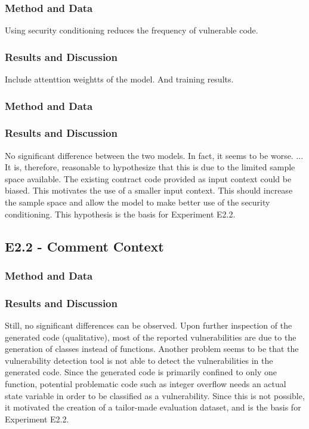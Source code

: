 \subsubsection{Method and Data}
Using security conditioning reduces the frequency of vulnerable code.

\subsubsection{Results and Discussion}
Include attenttion weightts of the model. And training results.

\label{sec:e2.1-complete-class-context}

\subsubsection{Method and Data}
\subsubsection{Results and Discussion}

No significant difference between the two models. In fact, it seems to be worse. ... It is, therefore, reasonable to hypothesize that this is due to the limited sample space available. The existing contract code provided as input context could be biased. This motivates the use of a smaller input context. This should increase the sample space and allow the model to make better use of the security conditioning. This hypothesis is the basis for Experiment E2.2.

\subsection{E2.2 - Comment Context}
\label{sec:e2.2-comment-context}

\subsubsection{Method and Data}

\subsubsection{Results and Discussion}
Still, no significant differences can be observed. Upon further inspection of the generated code (qualitative), most of the reported vulnerabilities are due to the generation of classes instead of functions. Another problem seems to be that the vulnerability detection tool is not able to detect the vulnerabilities in the generated code. Since the generated code is primarily confined to only one function, potential problematic code such as integer overflow needs an actual state variable in order to be classified as a vulnerability. Since this is not possible, it motivated the creation of a tailor-made evaluation dataset, and is the basis for Experiment E2.2.


